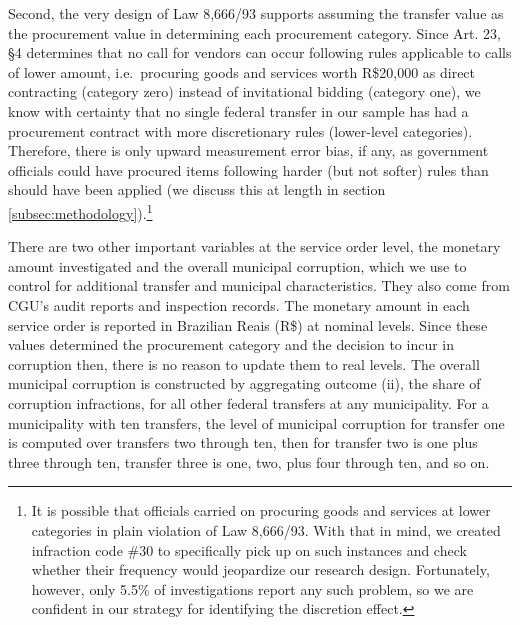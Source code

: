 \documentclass[11pt]{article}
\begin{document}
Second, the very design of Law 8,666/93 supports assuming the transfer value as the procurement value in determining each procurement category. Since Art. 23, \S 4 determines that no call for vendors can occur following rules applicable to calls of lower amount, i.e.~procuring goods and services worth R\$20,000 as direct contracting (category zero) instead of invitational bidding (category one), we know with certainty that no single federal transfer in our sample has had a procurement contract with more discretionary rules (lower-level categories). Therefore, there is only upward measurement error bias, if any, as government officials could have procured items following harder (but not softer) rules than should have been applied (we discuss this at length in section \ref{subsec:methodology}).\footnote{It is possible that officials carried on procuring goods and services at lower categories in plain violation of Law 8,666/93. With that in mind, we created infraction code \#30 to specifically pick up on such instances and check whether their frequency would jeopardize our research design. Fortunately, however, only 5.5\% of investigations report any such problem, so we are confident in our strategy for identifying the discretion effect.}

There are two other important variables at the service order level, the monetary amount investigated and the overall municipal corruption, which we use to control for additional transfer and municipal characteristics. They also come from CGU's audit reports and inspection records. The monetary amount in each service order is reported in Brazilian Reais (R\$) at nominal levels. Since these values determined the procurement category and the decision to incur in corruption then, there is no reason to update them to real levels. The overall municipal corruption is constructed by aggregating outcome (ii), the share of corruption infractions, for all other federal transfers at any municipality. For a municipality with ten transfers, the level of municipal corruption for transfer one is computed over transfers two through ten, then for transfer two is one plus three through ten, transfer three is one, two, plus four through ten, and so on.
\end{document}
